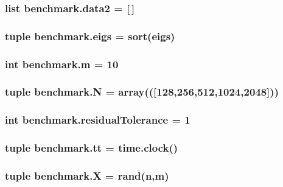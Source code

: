 \subsubsection[{data2}]{\setlength{\rightskip}{0pt plus 5cm}list benchmark.\+data2 = \mbox{[}$\,$\mbox{]}}\label{namespacebenchmark_a6643d327aa102a8e13e3fc908d9be2fb}
\hypertarget{namespacebenchmark_aef18ca54e5c510329532062a6051da43}{}
\subsubsection[{eigs}]{\setlength{\rightskip}{0pt plus 5cm}tuple benchmark.\+eigs = sort(eigs)}\label{namespacebenchmark_aef18ca54e5c510329532062a6051da43}
\hypertarget{namespacebenchmark_a16506035ffd4e4ce6c78ecec25a33371}{}
\subsubsection[{m}]{\setlength{\rightskip}{0pt plus 5cm}int benchmark.\+m = 10}\label{namespacebenchmark_a16506035ffd4e4ce6c78ecec25a33371}
\hypertarget{namespacebenchmark_a12396bf40f6310f099fa1103ab4df652}{}
\subsubsection[{N}]{\setlength{\rightskip}{0pt plus 5cm}tuple benchmark.\+N = array((\mbox{[}128,256,512,1024,2048\mbox{]}))}\label{namespacebenchmark_a12396bf40f6310f099fa1103ab4df652}
\hypertarget{namespacebenchmark_a4a9bbdb7a7ae217b5e9771fd0205b960}{}
\subsubsection[{residual\+Tolerance}]{\setlength{\rightskip}{0pt plus 5cm}int benchmark.\+residual\+Tolerance = 1}\label{namespacebenchmark_a4a9bbdb7a7ae217b5e9771fd0205b960}
\hypertarget{namespacebenchmark_afb838c51535e5b774247ae475c6021f3}{}
\subsubsection[{tt}]{\setlength{\rightskip}{0pt plus 5cm}tuple benchmark.\+tt = time.\+clock()}\label{namespacebenchmark_afb838c51535e5b774247ae475c6021f3}
\hypertarget{namespacebenchmark_ab33f3cd45ad909f26396e4aec122313b}{}
\subsubsection[{X}]{\setlength{\rightskip}{0pt plus 5cm}tuple benchmark.\+X = rand({\bf n},{\bf m})}\label{namespacebenchmark_ab33f3cd45ad909f26396e4aec122313b}
